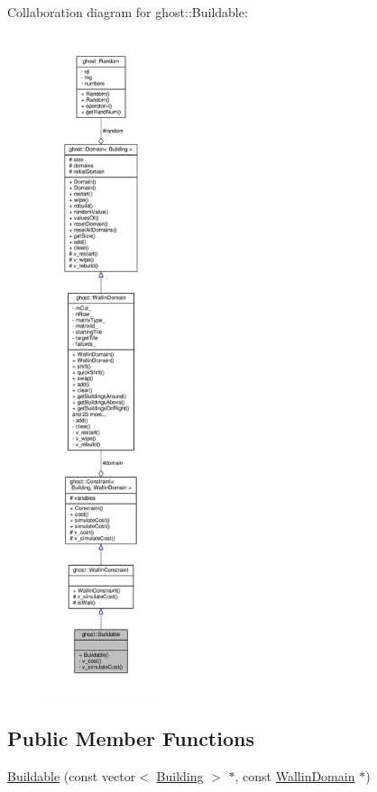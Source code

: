 Collaboration diagram for ghost\-:\-:Buildable\-:
\nopagebreak
\begin{figure}[H]
\begin{center}
\leavevmode
\includegraphics[height=550pt]{classghost_1_1Buildable__coll__graph}
\end{center}
\end{figure}
\subsection*{Public Member Functions}
\begin{DoxyCompactItemize}
\item 
\hyperlink{classghost_1_1Buildable_afb25530b221922dd29a0a5bd7cdd68c6}{Buildable} (const vector$<$ \hyperlink{classghost_1_1Building}{Building} $>$ $\ast$, const \hyperlink{classghost_1_1WallinDomain}{Wallin\-Domain} $\ast$)
\end{DoxyCompactItemize}
